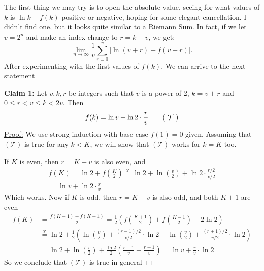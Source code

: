  
\begin{solution}
    The first thing we may try is to open the absolute value, seeing for what values of $k$ is $\ln{k}-f(k)$ positive or negative, hoping for some elegant cancellation. I didn't find one, but it looks quite similar to a Riemann Sum. In fact, if we let $v = 2^n$ and make an index change to $r = k - v$, we get:
    $$\lim_{n \to \infty} \frac{1}{v} \sum_{r=0}^{v} \big|\ln ({v+r}) - f(v+r)\big|.$$
    After experimenting with the first values of $f(k)$. We can arrive to the next statement \smallbreak

    \textbf{Claim 1:} Let $v,k,r$ be integers such that $v$ is a power of 2, $k = v + r$ and  $0 \leq r <v \leq k < 2v$. Then 
    \begin{align}
          f(k) = \ln{v} +  \ln{2}\cdot \frac{r}{v}   \tag{ $\mathcal{T}$ } 
    \end{align}
    \underline{Proof:} We use strong induction with base case $f(1)=0$ given. Assuming that $(\mathcal{T})$ is true for any $k<K$, we will show that $(\mathcal{T})$ works for $k=K$ too.
    
    If $K$ is even, then $r = K - v$ is also even, and 
    \begin{align*}
        f(K) = \ln 2 + f \left( \frac{K}{2}\right) \overset{\mathcal{T}}{=} \ln 2 +  \ln \left( \frac{v}{2} \right) + \ln 2 \cdot \frac{r/2}{v/2} \\
        = \ln v + \ln 2 \cdot \frac{r}{v}
    \end{align*}
    Which works. Now if $K$ is odd, then $r = K - v$ is also odd, and both $K \pm 1$ are even
    \begin{align*}
        f(K) &= \frac{f(K-1) + f(K+1)}{2} = \frac{1}{2} \left( f\left( \frac{K+1}{2} \right) + f\left( \frac{K-1}{2} \right) + 2\ln 2\right ) \\
        &\overset{\mathcal{T}}{=} \ln 2 +  \frac{1}{2} \left( \ln \left( \frac{v}{2} \right) + \frac{(r-1)/2}{v/2} \cdot \ln 2  + \ln\left( \frac{v}{2} \right) + \frac{(r+1)/2}{v/2} \cdot \ln 2 \right) \\
        &= \ln 2 + \ln\left( \frac{v}{2} \right) + \frac{\ln 2}{2}\left( \frac{r-1}{v} + \frac{r+1}{v}   \right) = \ln{v} + \frac{r}{v} \cdot \ln 2
    \end{align*}
    So we conclude that $(\mathcal{T})$ is true in general $\Box$


\end{solution}
